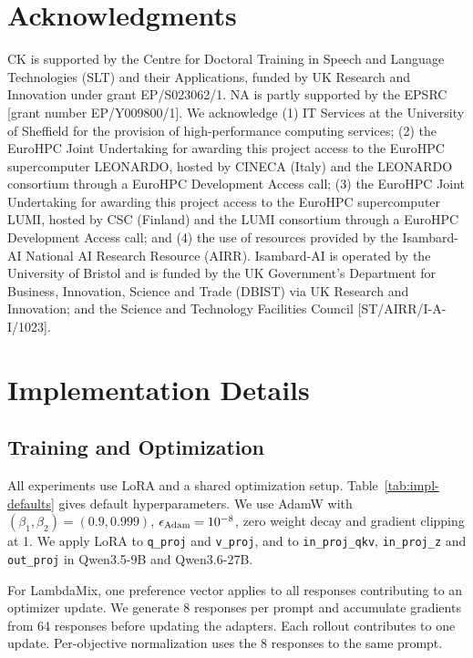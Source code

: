 \documentclass{article} %
\begin{document}
\section*{Acknowledgments}

CK is supported by the Centre for Doctoral Training in Speech and Language Technologies (SLT) and their Applications, funded by UK Research and Innovation under grant EP/S023062/1. NA is partly supported by the EPSRC [grant number EP/Y009800/1]. We acknowledge (1) IT Services at the University of Sheffield for the provision of high-performance computing services; (2) the EuroHPC Joint Undertaking for awarding this project access to the EuroHPC supercomputer LEONARDO, hosted by CINECA (Italy) and the LEONARDO consortium through a EuroHPC Development Access call; (3) the EuroHPC Joint Undertaking for awarding this project access to the EuroHPC supercomputer LUMI, hosted by CSC (Finland) and the LUMI consortium through a EuroHPC Development Access call; and (4) the use of resources provided by the Isambard-AI National AI Research Resource (AIRR). Isambard-AI is operated by the University of Bristol and is funded by the UK Government's Department for Business, Innovation, Science and Trade (DBIST) via UK Research and Innovation; and the Science and Technology Facilities Council [ST/AIRR/I-A-I/1023].





\clearpage
\appendix
\section{Implementation Details}
\label{app:repro}

\subsection{Training and Optimization}
\label{app:detail-training-setup}

All experiments use LoRA and a shared optimization setup. Table~\ref{tab:impl-defaults} gives default hyperparameters. We use AdamW with $(\beta_1,\beta_2)=(0.9,0.999)$, $\epsilon_{\rm Adam}=10^{-8}$, zero weight decay and gradient clipping at 1. We apply LoRA to \texttt{q\_proj} and \texttt{v\_proj}, and to \texttt{in\_proj\_qkv}, \texttt{in\_proj\_z} and \texttt{out\_proj} in \mbox{Qwen3.5-9B} and \mbox{Qwen3.6-27B}.


For LambdaMix, one preference vector applies to all responses contributing to an optimizer update. We generate 8 responses per prompt and accumulate gradients from 64 responses before updating the adapters. Each rollout contributes to one update. Per-objective normalization uses the 8 responses to the same prompt.
\end{document}
